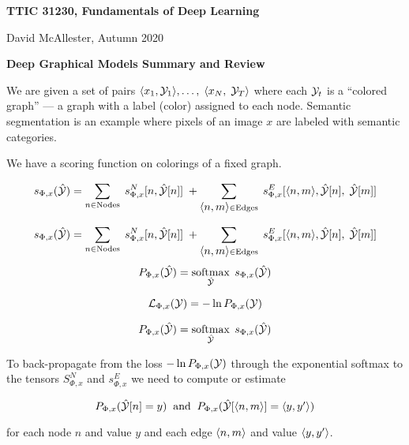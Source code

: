 




{\Huge

  \centerline{\bf TTIC 31230, Fundamentals of Deep Learning}
  \bigskip
  \centerline{David McAllester, Autumn 2020}
  \vfill
  \vfill
  \centerline{\bf Deep Graphical Models Summary and Review}
\vfill
\vfill
\vfill


We are given a set of pairs ${\mbox{$\langle x_1,{\cal Y}_1\rangle$}}, \ldots, \;{\mbox{$\langle x_N,\;{\cal Y}_T\rangle$}}$ where each ${\cal Y}_t$ is a ``colored graph'' --- a graph with a label
(color) assigned to each node.  Semantic segmentation is an example where pixels of an image $x$ are labeled with semantic categories.

\vfill
We have a scoring function on colorings of a fixed graph.

\vfill
{\huge
$$s_{\Phi,x}(\hat{\cal Y}) = \sum_{n \in \mathrm{Nodes}}\;s^N_{\Phi,x}[n,\hat{\cal Y}[n]]\; + \sum_{{\mbox{$\langle n,m\rangle$}} \in \mathrm{Edges}}\;s^E_{\Phi,x}[{\mbox{$\langle n,m\rangle$}},\hat{\cal Y}[n],\;\hat{\cal Y}[m]]$$
}


{\huge
$$s_{\Phi,x}(\hat{\cal Y}) = \sum_{n \in \mathrm{Nodes}}\;s^N_{\Phi,x}[n,\hat{\cal Y}[n]]\; + \sum_{{\mbox{$\langle n,m\rangle$}} \in \mathrm{Edges}}\;s^E_{\Phi,x}[{\mbox{$\langle n,m\rangle$}},\hat{\cal Y}[n],\;\hat{\cal Y}[m]]$$
}
\vfill
$$P_{\Phi,x}(\hat{\cal Y}) = \operatorname*{softmax}_{\hat{\cal Y}}\;s_{\Phi,x}(\hat{\cal Y})$$

\vfill
$${\cal L}_{\Phi,x}({\cal Y}) = - \ln P_{\Phi,x}({\cal Y})$$


$$P_{\Phi,x}(\hat{\cal Y}) = \operatorname*{softmax}_{\hat{\cal Y}}\;s_{\Phi,x}(\hat{\cal Y})$$

\vfill
To back-propagate from the loss $- \ln P_{\Phi,x}({\cal Y})$ through the exponential softmax to the tensors $S^N_{\Phi,x}$ and $s^E_{\Phi,x}$ we need to compute or
estimate

$$P_{\Phi,x}(\hat{\cal Y}[n] = y)\;\;\mathrm{and}\;\; P_{\Phi,x}(\hat{\cal Y}[{\mbox{$\langle n,m\rangle$}}] = {\mbox{$\langle y,y'\rangle$}})$$


\vfill
for each node $n$ and value $y$ and each edge ${\mbox{$\langle n,m\rangle$}}$ and value ${\mbox{$\langle y,y'\rangle$}}$.

}

